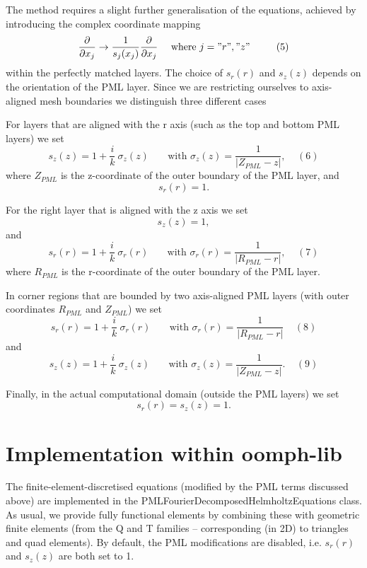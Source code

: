 The method requires a slight further generalisation of the equations, achieved by introducing the complex coordinate mapping \[ \frac{\partial}{\partial x_j} \to \frac{1}{s_j(x_j)} \frac{\partial}{\partial x_j} \ \ \ \ \mbox{where $j ="r","z"$} \ \ \ \ \ \ \ \ (5) \] within the perfectly matched layers. The choice of $ s_r(r) $ and $ s_z(z) $ depends on the orientation of the P\+ML layer. Since we are restricting ourselves to axis-\/aligned mesh boundaries we distinguish three different cases


\begin{DoxyItemize}
\item For layers that are aligned with the r axis (such as the top and bottom P\+ML layers) we set \[ s_z(z) = 1 +\frac{i}{k}\ \sigma_{z}(z) \ \ \ \ \ \ \ \mbox{ \ \ \ with \ \ \ } \sigma_{z}(z) = \frac{1}{|Z_{PML}-z|}, \ \ \ \ \ (6) \] where $ Z_{PML} $ is the z-\/coordinate of the outer boundary of the P\+ML layer, and \[ s_r(r) = 1. \]
\item For the right layer that is aligned with the z axis we set \[ s_z(z) = 1, \] and \[ s_r(r) = 1+\frac{i}{k} \ \sigma_{r}(r) \ \ \ \ \ \ \ \mbox{ \ \ \ with \ \ \ } \sigma_{r}(r) = \frac{1}{|R_{PML}-r|}, \ \ \ \ \ (7) \] where $ R_{PML} $ is the r-\/coordinate of the outer boundary of the P\+ML layer.
\item In corner regions that are bounded by two axis-\/aligned P\+ML layers (with outer coordinates $ R_{PML} $ and $ Z_{PML} $) we set \[ s_r(r) = 1 +\frac{i}{k}\ \sigma_{r}(r) \ \ \ \ \ \ \ \mbox{ \ \ \ with \ \ \ } \sigma_{r}(r) = \frac{1}{|R_{PML}-r|} \ \ \ \ \ (8) \] and \[ s_z(z) = 1+\frac{i}{k} \ \sigma_{z}(z) \ \ \ \ \ \ \ \mbox{ \ \ \ with \ \ \ } \sigma_{z}(z) = \frac{1}{|Z_{PML}-z|}. \ \ \ \ \ (9) \]
\item Finally, in the actual computational domain (outside the P\+ML layers) we set \[ s_r(r) = s_z(z) = 1. \]
\end{DoxyItemize}



\hypertarget{index_impl}{}\section{Implementation within oomph-\/lib}\label{index_impl}
The finite-\/element-\/discretised equations (modified by the P\+ML terms discussed above) are implemented in the {\ttfamily P\+M\+L\+Fourier\+Decomposed\+Helmholtz\+Equations} class. As usual, we provide fully functional elements by combining these with geometric finite elements (from the Q and T families -- corresponding (in 2D) to triangles and quad elements). By default, the P\+ML modifications are disabled, i.\+e. $ s_{r}(r) $ and $ s_{z}(z) $ are both set to 1.

